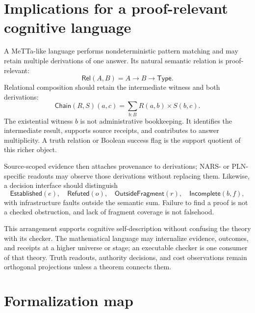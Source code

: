 \documentclass[11pt]{article}
\theoremstyle{remark}
\newcommand{\Rel}{\mathsf{Rel}}
\newcommand{\Chain}{\mathsf{Chain}}
\newcommand{\Outside}{\mathsf{OutsideFragment}}
\newcommand{\Incomplete}{\mathsf{Incomplete}}
\newcommand{\Established}{\mathsf{Established}}
\newcommand{\Refuted}{\mathsf{Refuted}}
\begin{document}
\section{Implications for a proof-relevant cognitive language}

A MeTTa-like language performs nondeterministic pattern matching and may retain
multiple derivations of one answer.  Its natural semantic relation is
proof-relevant:
\[
  \Rel(A,B)=A\to B\to\mathsf{Type}.
\]
Relational composition should retain the intermediate witness and both
derivations:
\[
  \Chain(R,S)(a,c)
   = \sum_{b:B} R(a,b)\times S(b,c).
\]
The existential witness $b$ is not administrative bookkeeping.  It identifies
the intermediate result, supports source receipts, and contributes to answer
multiplicity.  A truth relation or Boolean success flag is the support quotient
of this richer object.

Source-scoped evidence then attaches provenance to derivations; NARS- or
PLN-specific readouts may observe those derivations without replacing them.
Likewise, a decision interface should distinguish
\[
  \Established(e),\quad \Refuted(o),\quad \Outside(r),\quad
  \Incomplete(b,f),
\]
with infrastructure faults outside the semantic sum.  Failure to find a proof
is not a checked obstruction, and lack of fragment coverage is not falsehood.

This arrangement supports cognitive self-description without confusing the
theory with its checker.  The mathematical language may internalize evidence,
outcomes, and receipts at a higher universe or stage; an executable checker is
one consumer of that theory.  Truth readouts, authority decisions, and cost
observations remain orthogonal projections unless a theorem connects them.

\section{Formalization map}
\end{document}
